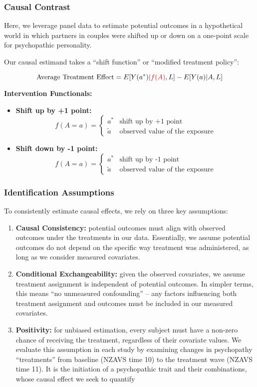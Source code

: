 \documentclass[
  singlecolumn]{article}
\begin{document}
\subsubsection{Causal Contrast}\label{causal-contrast}

Here, we leverage panel data to estimate potential outcomes in a
hypothetical world in which partners in couples were shifted up or down
on a one-point scale for psychopathic personality.

Our causal estimand takes a ``shift function'' or ``modified treatment
policy'':

\[ \text{Average Treatment Effect} = E[Y(a^*)|\textcolor{red}{f(A)},L] - E[Y(a)|A,L] \]

\textbf{Intervention Functionals:}

\begin{itemize}
\item
  \textbf{Shift up by +1 point:} \[
   f(A = a) = \begin{cases} a^* & \text{shift up by +1 point} \\ 
   \tilde{a} & \text{observed value of the exposure} \end{cases}
   \]
\item
  \textbf{Shift down by -1 point:} \[
   f(A = a) = \begin{cases} a^* & \text{shift up by -1 point} \\ 
   \tilde{a} & \text{observed value of the exposure} \end{cases}
   \]
\end{itemize}

\subsubsection{Identification
Assumptions}\label{identification-assumptions}

To consistently estimate causal effects, we rely on three key
assumptions:

\begin{enumerate}
\def\labelenumi{\arabic{enumi}.}
\item
  \textbf{Causal Consistency:} potential outcomes must align with
  observed outcomes under the treatments in our data. Essentially, we
  assume potential outcomes do not depend on the specific way treatment
  was administered, as long as we consider measured covariates.
\item
  \textbf{Conditional Exchangeability:} given the observed covariates,
  we assume treatment assignment is independent of potential outcomes.
  In simpler terms, this means ``no unmeasured confounding'' -- any
  factors influencing both treatment assignment and outcomes must be
  included in our measured covariates.
\item
  \textbf{Positivity:} for unbiased estimation, every subject must have
  a non-zero chance of receiving the treatment, regardless of their
  covariate values. We evaluate this assumption in each study by
  examining changes in psychopathy ``treatments'' from baseline (NZAVS
  time 10) to the treatment wave (NZAVS time 11). It is the initiation
  of a psychopathic trait and their combinations, whose causal effect we
  seek to quantify
\end{enumerate}
\end{document}
